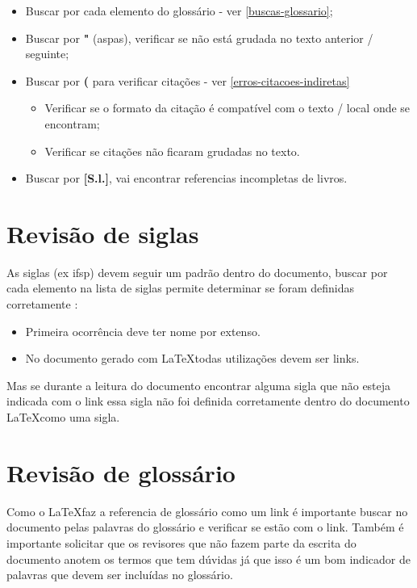 \begin{itemize}
    \item Buscar por cada elemento do glossário - ver \autoref{buscas-glossario};
            
    \item Buscar por \textbf{"} (aspas), verificar se não está grudada no texto anterior / seguinte;
    
    \item Buscar por \textbf{(} para verificar citações - ver \autoref{erros-citacoes-indiretas}
        \begin{itemize}
            \item Verificar se o formato da citação é compatível com o texto / local onde se encontram;
            
            \item Verificar se citações não ficaram grudadas no texto.
        \end{itemize}
            
    \item Buscar por \textbf{[S.l.]}, vai encontrar referencias incompletas de livros.
\end{itemize}

\section{Revisão de siglas}
\label{buscas-siglas}

As siglas (ex \ac{ifsp}) devem seguir um padrão dentro do documento, buscar por cada elemento na lista de siglas permite determinar se foram definidas corretamente :

\begin{itemize}
    \item Primeira ocorrência deve ter nome por extenso.
    
    \item No documento gerado com \LaTeX \space todas utilizações devem ser links.
\end{itemize}

Mas se durante a leitura do documento encontrar alguma sigla que não esteja indicada com o link essa sigla não foi definida corretamente dentro do documento \LaTeX  \space como uma sigla.

\section{Revisão de glossário}
\label{buscas-glossario}

Como o \LaTeX \space faz a referencia de glossário como um link é importante buscar no documento pelas palavras do glossário e verificar se estão com o link. Também é importante solicitar que os revisores que não fazem parte da escrita do documento anotem os termos que tem dúvidas já que isso é um bom indicador de palavras que devem ser incluídas no glossário.


